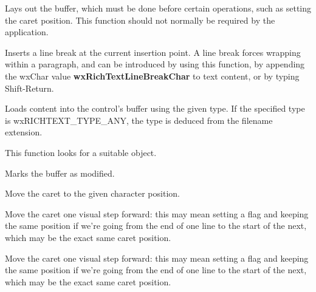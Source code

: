 Lays out the buffer, which must be done before certain operations, such as
setting the caret position. This function should not normally be required by the
application.

\label{wxrichtextctrllinebreak}


Inserts a line break at the current insertion point. A line break forces wrapping within a paragraph, and
can be introduced by using this function, by appending the wxChar value {\bf wxRichTextLineBreakChar} to text content,
or by typing Shift-Return.

\label{wxrichtextctrlloadfile}


Loads content into the control's buffer using the given type. If the specified type
is wxRICHTEXT\_TYPE\_ANY, the type is deduced from the filename extension.

This function looks for a suitable  object.

\label{wxrichtextctrlmarkdirty}


Marks the buffer as modified.

\label{wxrichtextctrlmovecaret}


Move the caret to the given character position.

\label{wxrichtextctrlmovecaretback}


Move the caret one visual step forward: this may mean setting a flag
and keeping the same position if we're going from the end of one line
to the start of the next, which may be the exact same caret position.

\label{wxrichtextctrlmovecaretforward}


Move the caret one visual step forward: this may mean setting a flag
and keeping the same position if we're going from the end of one line
to the start of the next, which may be the exact same caret position.

